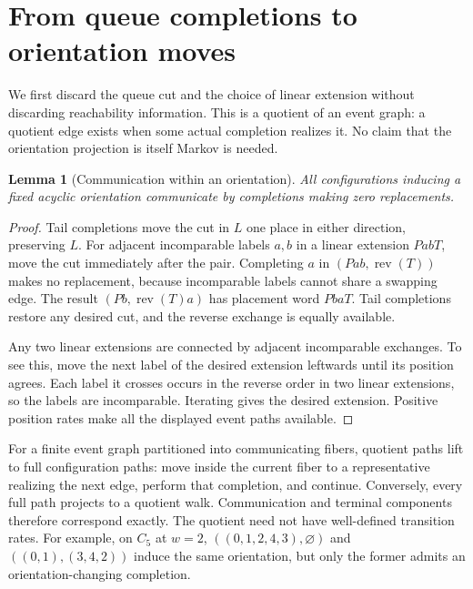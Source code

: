 \documentclass[11pt]{article}
\newtheorem{lemma}[theorem]{Lemma}
\theoremstyle{remark}
\newcommand{\rev}{\operatorname{rev}}
\newcommand{\emptyq}{\varnothing}
\begin{document}
\section{From queue completions to orientation moves}\label{sec:quotient}
We first discard the queue cut and the choice of linear extension without discarding reachability information. This is a quotient of an event graph: a quotient edge exists when some actual completion realizes it. No claim that the orientation projection is itself Markov is needed.

\begin{lemma}[Communication within an orientation]\label{lem:fiber}
All configurations inducing a fixed acyclic orientation communicate by completions making zero replacements.
\end{lemma}
\begin{proof}
Tail completions move the cut in $L$ one place in either direction, preserving $L$. For adjacent incomparable labels $a,b$ in a linear extension $PabT$, move the cut immediately after the pair. Completing $a$ in $(Pab,\rev(T))$ makes no replacement, because incomparable labels cannot share a swapping edge. The result $(Pb,\rev(T)a)$ has placement word $PbaT$. Tail completions restore any desired cut, and the reverse exchange is equally available.

Any two linear extensions are connected by adjacent incomparable exchanges. To see this, move the next label of the desired extension leftwards until its position agrees. Each label it crosses occurs in the reverse order in two linear extensions, so the labels are incomparable. Iterating gives the desired extension. Positive position rates make all the displayed event paths available.
\end{proof}

For a finite event graph partitioned into communicating fibers, quotient paths lift to full configuration paths: move inside the current fiber to a representative realizing the next edge, perform that completion, and continue. Conversely, every full path projects to a quotient walk. Communication and terminal components therefore correspond exactly. The quotient need not have well-defined transition rates. For example, on $C_5$ at $w=2$, $((0,1,2,4,3),\emptyq)$ and $((0,1),(3,4,2))$ induce the same orientation, but only the former admits an orientation-changing completion.
\end{document}
